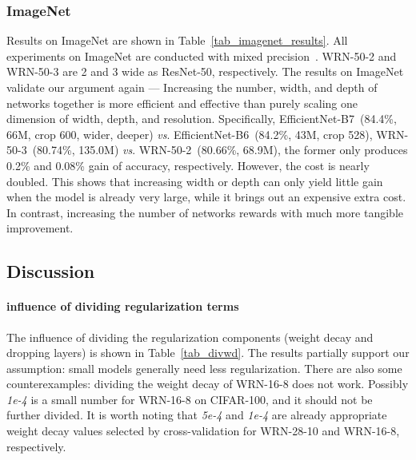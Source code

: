 \documentclass[lettersize,journal]{IEEEtran}
\newcommand{\vs}{\textit{vs}.}
\begin{document}
\subsubsection{ImageNet}
Results on ImageNet are shown in Table~\ref{tab_imagenet_results}.
All experiments on ImageNet are conducted with mixed precision~\cite{2018_AMP}.
WRN-50-2 and WRN-50-3 are 2 and 3 wide as ResNet-50, respectively.
The results on ImageNet validate our argument again --- 
Increasing the number, width, and depth of networks together
is more efficient and effective than purely scaling one dimension of width, depth, and resolution.
Specifically,
EfficientNet-B7~(84.4\%, 66M, crop 600, wider, deeper)
\vs
EfficientNet-B6~(84.2\%, 43M, crop 528), 
WRN-50-3~(80.74\%, 135.0M)
\vs
WRN-50-2~(80.66\%, 68.9M),
the former
only produces 0.2\%
and 0.08\% gain of accuracy, respectively.
However, the cost is nearly doubled.
This shows that increasing width or depth 
can only yield little gain when the model is already very large,
while it brings out an expensive extra cost. 
In contrast, increasing the number of networks rewards
with much more tangible improvement.


\subsection{Discussion}
\paragraph{influence of dividing regularization terms}
The influence of dividing the regularization components
(weight decay and dropping layers) is shown in Table~\ref{tab_divwd}.
The results partially support our assumption: small models generally
need less regularization.
There are also some counterexamples: dividing the weight decay of
WRN-16-8 does not work. Possibly \textit{1e-4} is a small number for
WRN-16-8 on CIFAR-100, and it should not be further divided.
It is worth noting that \textit{5e-4} and \textit{1e-4} are already
appropriate weight decay values selected by cross-validation for WRN-28-10 and WRN-16-8,
respectively.
\end{document}
